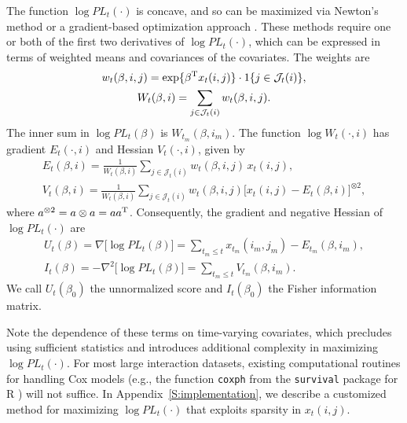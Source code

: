 \documentclass[final]{statsoc}
\begin{document}
The function $\log \mathit{PL}_t(\cdot)$ is concave, and so can be maximized
via Newton's method or a gradient-based optimization approach
\citep{nocedal2006numerical}.  These methods require one or both of the
first two derivatives of $\log\mathit{PL}_t(\cdot)$, which can be
expressed in terms of weighted means and covariances of the covariates.  The
weights are
\begin{subequations}
\begin{gather}
    w_{t}(\beta, i,j)
        =
        \exp\{ \beta^{\mathrm{T}} x_t(i,j) \}
        \cdot
        1\{ j \in \mathcal{J}_t(i)\}, \\
    W_{t}(\beta, i)
        =
        \sum_{j \in \mathcal{J}_t(i)} w_{t}(\beta, i,j).
\end{gather}
\end{subequations}
The inner sum in $\log \mathit{PL}_t(\beta)$ is
$W_{t_m}\!(\beta, i_m)$.  The function
$\log W_{t}(\cdot, i)$ has gradient $E_{t}(\cdot, i)$ and Hessian
$V_{t}(\cdot, i)$, given by
\begin{subequations}
\begin{gather}
    E_{t}(\beta, i)
        =
        \frac{1}{W_{t}(\beta, i)}
        \sum_{j \in \mathcal{J}_t(i)}
            w_{t}(\beta, i,j) \, x_{t}(i,j), \label{E:wt-expectation}\\
    V_{t}(\beta, i)
        =
        \frac{1}{W_{t}(\beta, i)}
        \sum_{j \in \mathcal{J}_t(i)}
            w_{t}(\beta, i,j)
            \Big[ x_{t}(i,j) - E_{t}(\beta, i)\Big]^{\otimes 2},
\end{gather}
\end{subequations}
where $a^{\otimes 2} = a \otimes a = a a^{\mathrm{T}}$.
Consequently, the gradient and negative Hessian of
$\log \mathit{PL}_t(\cdot)$ are
\begin{subequations}
\begin{gather}
    \label{E:log-pl-gradient}
    U_t(\beta)
        =
        \nabla \big[ \log \mathit{PL}_t(\beta) \big]
        =
        \sum_{t_m \leq t}
            x_{t_m}(i_m, j_m) - E_{t_m}(\beta, i_m), \\
    \label{E:log-pl-neg-hessian}
    I_t(\beta)
        =
        -\nabla^2 \big[ \log \mathit{PL}_t(\beta) \big]
        =
        \sum_{t_m \leq t}
            V_{t_m}(\beta, i_m).
\end{gather}
\end{subequations}
We call $U_t(\beta_0)$ the unnormalized score and $I_t(\beta_0)$
the Fisher information matrix.

Note the dependence of these terms on time-varying covariates,
which precludes using sufficient statistics and introduces
additional complexity in maximizing $\log \mathit{PL}_t(\cdot)$.
For most large interaction datasets,
existing computational routines for handling Cox models
(e.g., the function \texttt{coxph} from the \texttt{survival}
package for R \citep{therneau2009survival}) will not suffice.  In
Appendix~\ref{S:implementation}, we describe a customized method for
maximizing $\log \mathit{PL}_t(\cdot)$ that exploits sparsity in
$x_t(i,j)$.
\end{document}
